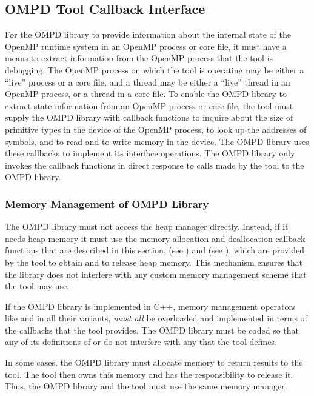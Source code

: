 \subsection{OMPD Tool Callback Interface}
\label{subsec:ompd-tool-callback-interface}

For the OMPD library to provide information about the internal state of the 
OpenMP runtime system in an OpenMP process or core file, it must have a means 
to extract information from the OpenMP process that the tool is debugging.
The OpenMP process on which the tool is operating may be either a ``live'' 
process or a core file, and a thread may be either a ``live'' thread in an 
OpenMP process, or a thread in a core file. To enable the OMPD library to 
extract state information from an OpenMP process or core file, the tool must 
supply the OMPD library with callback functions to inquire about the size of 
primitive types in the device of the OpenMP process, to look up the addresses 
of symbols, and to read and to write memory in the device. The OMPD library 
uses these callbacks to implement its interface operations. The OMPD library 
only invokes the callback functions in direct response to calls made by the 
tool to the OMPD library.



\subsubsection{Memory Management of OMPD Library}
The OMPD library must not access the heap manager directly. Instead, if it 
needs heap memory it must use the memory allocation and deallocation callback 
functions that are described in this section, 
(see ) and 
(see ), which are
provided by the tool to obtain and to release heap memory. This mechanism
ensures that the library does not interfere with any custom memory management 
scheme that the tool may use.

If the OMPD library is implemented in C++, memory management operators like 
 and  in all their variants, \emph{must all} be overloaded 
and implemented in terms of the callbacks that the tool provides. The OMPD 
library must be coded so that any of its definitions of  or 
 do not interfere with any that the tool defines.

In some cases, the OMPD library must allocate memory to return results to the 
tool. The tool then owns this memory and has the responsibility to release
it. Thus, the OMPD library and the tool must use the same memory manager.

